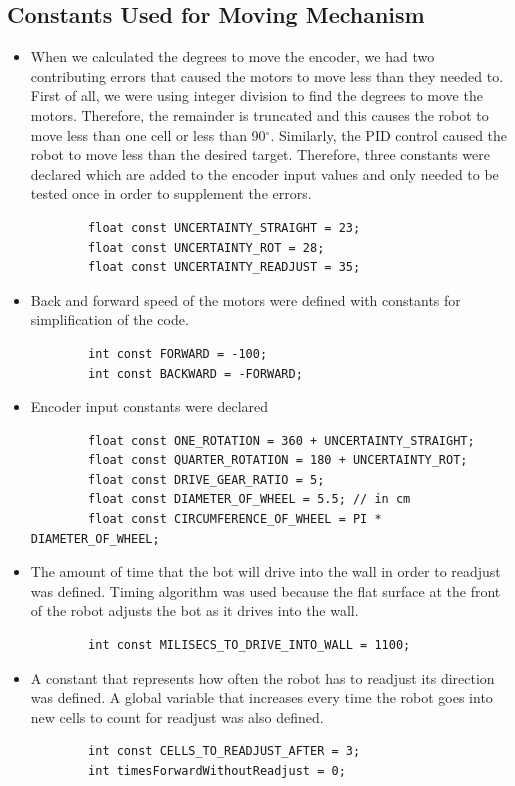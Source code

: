 \documentclass[11pt]{article}
\begin{document}

\subsection{Constants Used for Moving Mechanism}
\begin{itemize}
\item When we calculated the degrees to move the encoder, we had two contributing errors that caused the motors to move less than they needed to. First of all, we were using integer division to find the degrees to move the motors. Therefore, the remainder is truncated and this causes the robot to move less than one cell or less than 90$^{\circ}$. Similarly, the PID control caused the robot to move less than the desired target. Therefore, three constants were declared which are added to the encoder input values and only needed to be tested once in order to supplement the errors. 
	\begin{verbatim}
		float const UNCERTAINTY_STRAIGHT = 23;
		float const UNCERTAINTY_ROT = 28;
		float const UNCERTAINTY_READJUST = 35;
	\end{verbatim} 
\item Back and forward speed of the motors were defined with constants for simplification of the code. 
	\begin{verbatim}
		int const FORWARD = -100;
		int const BACKWARD = -FORWARD;
	\end{verbatim} 
\item Encoder input constants were declared
	\begin{verbatim}
		float const ONE_ROTATION = 360 + UNCERTAINTY_STRAIGHT;
		float const QUARTER_ROTATION = 180 + UNCERTAINTY_ROT;
		float const DRIVE_GEAR_RATIO = 5;
		float const DIAMETER_OF_WHEEL = 5.5; // in cm
		float const CIRCUMFERENCE_OF_WHEEL = PI * DIAMETER_OF_WHEEL;
	\end{verbatim} 
\item The amount of time that the bot will drive into the wall in order to readjust was defined. Timing algorithm was used because the flat surface at the front of the robot adjusts the bot as it drives into the wall.
	\begin{verbatim}
		int const MILISECS_TO_DRIVE_INTO_WALL = 1100;
	\end{verbatim} 
\item A constant that represents how often the robot has to readjust its direction was defined. A global variable that increases every time the robot goes into new cells to count for readjust was also defined.
	\begin{verbatim}
		int const CELLS_TO_READJUST_AFTER = 3;
		int timesForwardWithoutReadjust = 0;
	\end{verbatim}  
\end{itemize}
\newpage
\end{document}
